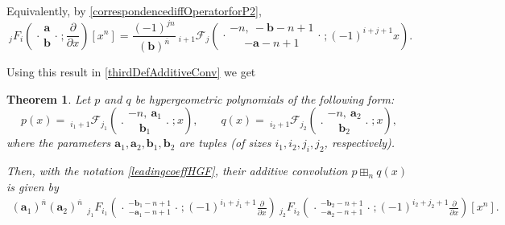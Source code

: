 \documentclass[reqno,11pt]{amsart}
\newtheorem{theorem}{Theorem}[section]
\theoremstyle{remark}
\newcommand{\raising}[2]{\left(#1\right)^{\overline{#2}}}
\newcommand*\pFq[5]{%
 {\ }_{#1}{\mathcal F}_{#2}{\left(\genfrac..{0pt}{}{#3}{#4};#5\right)}%
}
\newcommand*\HGF[5]{%
 {\ }_{#1} F_{#2}{\left(\genfrac..{0pt}{}{#3}{#4};#5\right)}%
}
\begin{document}
Equivalently, by \eqref{correspondencediffOperatorforP2}, 
\begin{equation} \label{D_p3}
    \HGF{j}{i}{\bm a}{\bm b}{\frac{\partial}{\partial x}} [x^n]= \frac{(-1)^{jn}}{\raising{\bm b}{n}} \pFq{i+1}{j}{-n,\ -\bm b-n+1}{-\bm a-n+1}{(-1)^{i+j+1}x}.
\end{equation}

Using this result in \eqref{thirdDefAdditiveConv} we get
\begin{theorem}
\label{thm.additive.conv.HG}
Let $p$ and $q$ be hypergeometric polynomials of the following form:
$$
p(x)= \pFq{i_1+1}{j_1}{-n,\ \bm a_1}{\bm b_1}{x}, \qquad q(x)=\pFq{i_2+1}{j_2}{-n,\ \bm a_2}{\bm b_2}{x},
$$
where the parameters $\bm a_1,\bm a_2,\bm b_1,\bm b_2 $ are tuples (of sizes $i_1,i_2,j_i,j_2$, respectively). 

Then, with the notation \eqref{leadingcoeffHGF}, their additive convolution $p\boxplus_n q(x)$ is given by
\begin{equation*}
    \begin{split}
      \raising{\bm a_1}{n} \raising{\bm a_2}{n}  \, \HGF{j_1}{i_1}{-\bm b_1-n+1}{-\bm a_1-n+1}{(-1)^{i_1+j_1+1}\frac{\partial}{\partial x}}  \HGF{j_2}{i_2}{-\bm b_2-n+1}{-\bm a_2-n+1}{(-1)^{i_2+j_2+1}\frac{\partial}{\partial x}} [x^n].
    \end{split}
\end{equation*} 
\end{theorem}
\end{document}
